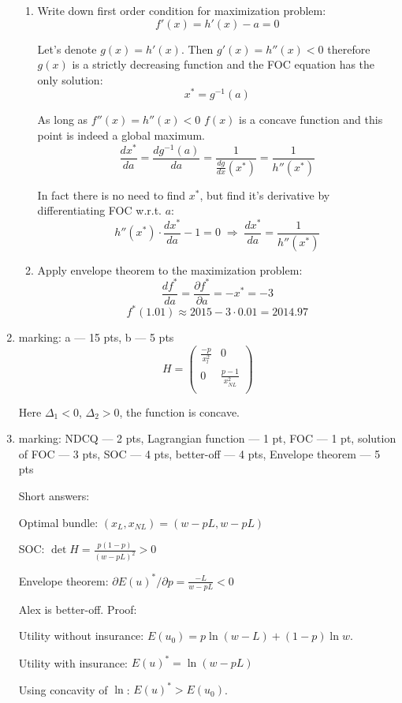 \begin{enumerate}
\begin{enumerate}
\item Write down first order condition for maximization problem:
\[
f'(x) = h'(x)-a=0
\]

Let's denote \(g(x)=h'(x)\). Then \(g'(x)=h''(x)<0\) therefore \(g(x)\) is a strictly decreasing function and the FOC equation has the only solution:
\[
x^* = g^{-1}(a)
\]

As long as \(f''(x)=h''(x)<0\) \(f(x)\) is a concave function and this point is indeed a global maximum.
\[
\frac{dx^*}{da} = \frac{dg^{-1}(a)}{da} =\frac{1}{\frac{dg}{dx}(x^*)}=\frac{1}{h''(x^*)}
\]

In fact there is no need to find \(x^*\), but find it's derivative by differentiating FOC w.r.t. \(a\):
\[
h''(x^*) \cdot \frac{dx^*}{da} - 1 = 0 \; \Longrightarrow \; \frac{dx^*}{da} = \frac{1}{h''(x^*)}
\]

\item Apply envelope theorem to the maximization problem:
\[
\frac{df^*}{da} = \frac{\partial f^*}{\partial a} = -x^* = -3
\]
\[
f^*(1.01) \approx 2015 -3\cdot0.01 = 2014.97
\]
\end{enumerate}

\item marking: a --- 15 pts, b --- 5 pts
\[
H = \begin{pmatrix}
\frac{-p}{x_l^2} & 0 \\
0 & \frac{p-1}{x_{NL}^2} \\
\end{pmatrix}
\]

Here $\Delta_1 < 0$, $\Delta_2 > 0$, the function is concave.

\item marking: NDCQ --- 2 pts, Lagrangian function --- 1 pt, FOC --- 1 pt, solution of FOC --- 3 pts, SOC ---
4 pts, better-off --- 4 pts, Envelope theorem --- 5 pts

Short answers:

Optimal bundle: $(x_L, x_{NL})=(w-pL, w-pL)$

SOC: $\det H = \frac{p(1-p)}{(w-pL)^2}>0$

Envelope theorem: $\partial E(u)^*/\partial p = \frac{-L}{w-pL}<0$

Alex is better-off. Proof:

Utility without insurance: $E(u_0)=p \ln (w-L) + (1-p) \ln w$.

Utility with insurance: $E(u)^*=\ln (w-pL)$

Using concavity of $\ln$: $E(u)^* > E(u_0)$.
\end{enumerate}


